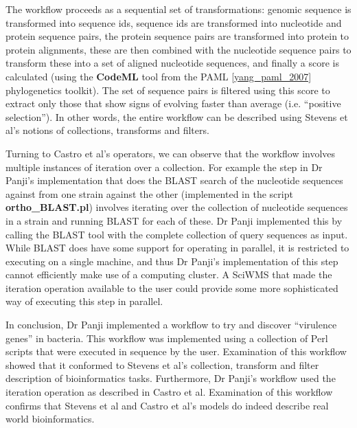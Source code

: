 \documentclass[a4paper,10pt]{scrreprt} \usepackage[utf8]{inputenc}
\begin{document}
The workflow proceeds as a sequential set of transformations: genomic sequence is transformed into sequence  
ids, sequence ids are transformed into nucleotide and protein sequence pairs, the protein sequence pairs
are transformed into protein to protein alignments, these are then combined with the nucleotide sequence 
pairs to transform these into a set of aligned nucleotide sequences, and finally a score is calculated 
(using the \textbf{CodeML} tool from the PAML \ref{yang_paml_2007} phylogenetics toolkit). The set of 
sequence pairs is filtered using this score to extract only those that show signs of evolving faster than
average (i.e. ``positive selection''). In other words, the entire workflow can be described using Stevens et al's 
notions of collections, transforms and filters.

Turning to Castro et al's operators, we can observe that the workflow involves multiple instances of
iteration over a collection. For example the step in Dr Panji's implementation that does the \gls{BLAST} search
of the nucleotide sequences against from one strain against the other (implemented in the script
\textbf{ortho\_BLAST.pl}) involves iterating over the collection of nucleotide sequences in a strain
and running \gls{BLAST} for each of these. Dr Panji implemented this by calling the \gls{BLAST} tool with
the complete collection of query sequences as input. While \gls{BLAST} does have some support for
operating in parallel, it is restricted to executing on a single machine, and thus Dr Panji's implementation
of this step cannot efficiently make use of a computing cluster. A \gls{SciWMS} that made the iteration
operation available to the user could provide some more sophisticated way of executing this step in parallel.

In conclusion, Dr Panji implemented a workflow to try and discover ``virulence genes'' in bacteria. This workflow
was implemented using a collection of Perl scripts that were executed in sequence by the user. Examination of
this workflow showed that it conformed to Stevens et al's collection, transform and filter description
of bioinformatics tasks. Furthermore, Dr Panji's workflow used the iteration operation as described 
in Castro et al. Examination of this workflow confirms that Stevens et al and Castro et al's models do indeed
describe real world bioinformatics.

\end{document}
